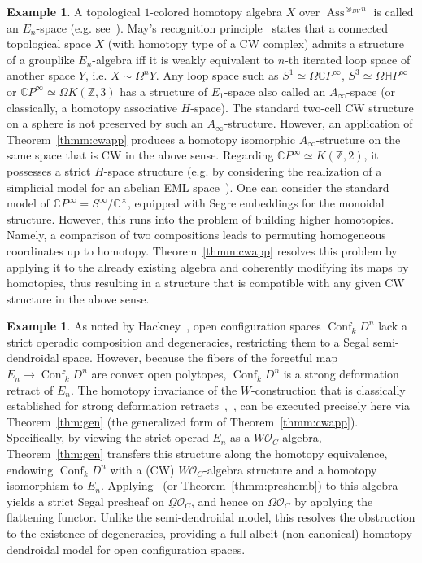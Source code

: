 \documentclass{amsart}
\theoremstyle{definition}
\newtheorem{example}[formula]{Example}
\theoremstyle{remark}
\newcommand{\Z}{\mathbb Z}
\newcommand{\C}{\mathbb C}
\newcommand{\Hc}{\mathbb H}
\DeclareMathOperator{\Ass}{Ass}
\DeclareMathOperator{\Conf}{Conf}
\begin{document}
	\begin{example}
		A topological $1$-colored homotopy algebra $X$ over $\Ass^{\otimes_{BV} n}$ is called an $E_{n}$-space (e.g. see~\cite{ma-sh-st-00}).
		May's recognition principle~\cite{ma-72} states that a connected topological space $X$ (with homotopy type of a CW complex) admits a structure of a grouplike $E_n$-algebra iff it is weakly equivalent to $n$-th iterated loop space of another space $Y$, i.e. $X\sim \Omega^{n} Y$.
		Any loop space such as $S^{1}\simeq\Omega \C P^{\infty}$, $S^{3}\simeq \Omega \Hc P^{\infty}$ or $\C P^{\infty}\simeq \Omega K(\Z,3)$ has a structure of $E_{1}$-space also called an $A_{\infty}$-space (or classically, a homotopy associative $H$-space).
		The standard two-cell CW structure on a sphere is not preserved by such an $A_{\infty}$-structure.
		However, an application of Theorem~\ref{thmm:cwapp} produces a homotopy isomorphic $A_{\infty}$-structure on the same space that is CW in the above sense.
		Regarding $\C P^{\infty}\simeq K(\Z,2)$, it possesses a strict $H$-space structure (e.g. by considering the realization of a simplicial model for an abelian EML space~\cite{ma-67}).
		One can consider the standard model of $\C P^{\infty}=S^{\infty}/\C^{\times}$, equipped with Segre embeddings for the monoidal structure.
		However, this runs into the problem of building higher homotopies. 
		Namely, a comparison of two compositions leads to permuting homogeneous coordinates up to homotopy.
		Theorem~\ref{thmm:cwapp} resolves this problem by applying it to the already existing algebra and 
		coherently modifying its maps by homotopies, thus resulting in a structure that is compatible with any given CW structure in the above sense.
	\end{example}
	
	\begin{example}
		As noted by Hackney~\cite{ha-18}, open configuration spaces $\Conf_{k} D^{n}$ lack a strict operadic composition and degeneracies, restricting them to a Segal semi-dendroidal space. 
		However, because the fibers of the forgetful map $E_{n}\to \Conf_{k} D^{n}$ are convex open polytopes, $\Conf_{k} D^{n}$ is a strong deformation retract of $E_{n}$. 
		The homotopy invariance of the $W$-construction that is classically established for strong deformation retracts~\cite[Ch.3]{bo-vo-73},~\cite[\S4]{be-mo-06'}, can be executed precisely here via Theorem~\ref{thm:gen} (the generalized form of Theorem~\ref{thmm:cwapp}). 
		Specifically, by viewing the strict operad $E_n$ as a $W\mathcal{O}_{C}$-algebra, Theorem~\ref{thm:gen} transfers this structure along the homotopy equivalence, endowing $\Conf_{k} D^{n}$ with a (CW) $W\mathcal{O}_{C}$-algebra structure and a homotopy isomorphism to $E_n$.
		Applying~\cite[Theorem~B.6]{clrrw-22} (or Theorem~\ref{thmm:preshemb}) to this algebra yields a strict Segal presheaf on $\underline{\Omega} \mathcal{O}_{C}$, and hence on $\Omega \mathcal{O}_{C}$ by applying the flattening functor. 
		Unlike the semi-dendroidal model, this resolves the obstruction to the existence of degeneracies, providing a full albeit (non-canonical) homotopy dendroidal model for open configuration spaces.
	\end{example}
	
\end{document}
